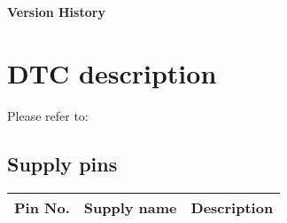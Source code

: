 









\newpage
\raggedright
\Large {\bf Version History}
\normalsize

\newpage
\raggedright
\tableofcontents
\newpage
\pagestyle{fancy}

\chapter{DTC description}

Please refer to:
\begin{itemize}
\end{itemize}

\jj
\newpage
\section{Supply pins}

 \vskip -5mm
\begin{table}[htbp]
\label{tabular:pins} 
\begin{center}
\vskip 5mm
\begin{tabularx}{\textwidth}{|r|r|X|}
\hline
Pin No. & Supply name & Description \\ \hline


\end{tabularx}
\end{center}
\end{table}



